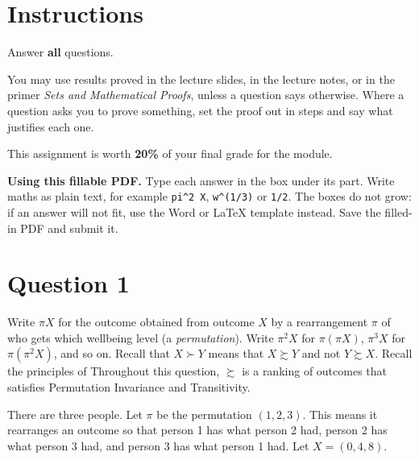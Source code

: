 \iffillable\begin{Form}\fi
\maketitle

\section*{Instructions}

Answer \textbf{all} questions.

You may use results proved in the lecture slides, in the lecture notes, or in
the primer \emph{Sets and Mathematical Proofs}, unless a question says otherwise.
Where a question asks you to prove something, set the proof out in steps and say
what justifies each one.

This assignment is worth \textbf{20\%} of your final grade for the module.

\iffillable
\textbf{Using this fillable PDF.} Type each answer in the box under its part. Write maths as plain text, for example \texttt{pi\^{}2 X}, \texttt{w\^{}(1/3)} or \texttt{1/2}. The boxes do not grow: if an answer will not fit, use the Word or LaTeX template instead. Save the filled-in PDF and submit it.
\fi

\section*{Question 1}

Write $\pi X$ for the outcome obtained from outcome $X$ by a rearrangement $\pi$ of who gets which wellbeing level (a \emph{permutation}). Write $\pi^2 X$ for $\pi(\pi X)$, $\pi^3 X$ for $\pi(\pi^2 X)$, and so on. Recall that $X \succ Y$ means that $X \succsim Y$ and not $Y \succsim X$. Recall the principles of
%
Throughout this question, $\succsim$ is a ranking of outcomes that satisfies Permutation Invariance and Transitivity.

There are three people. Let $\pi$ be the permutation $(1, 2, 3)$. This means it rearranges an outcome so that person 1 has what person 2 had, person 2 has what person 3 had, and person 3 has what person 1 had. Let $X = (0, 4, 8)$.


\end{Form}
